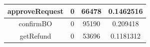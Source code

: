 \begin{table}[h!]
\begin{center}
\begin{tabular}{cccc}
approveRequest           & 0                                                                                  & 66478         & 0.1462516  \\ \hline
confirmBO                & 0                                                                                  & 95190         & 0.209418   \\ \hline
getRefund                & 0                                                                                  & 53696         & 0.1181312  \\ \hline
\end{tabular}
\end{center}
\end{table}



 
